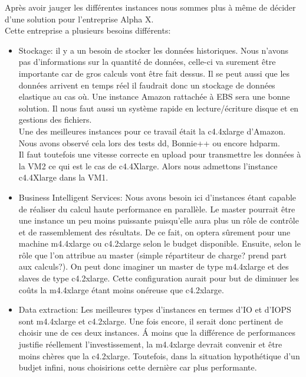 \documentclass[11pt]{article}
\begin{document}
Après avoir jauger les différentes instances nous sommes plus à même 
de décider d'une solution pour l'entreprise Alpha X. \\
Cette entreprise a plusieurs besoins différents:
\begin{itemize}
	\item Stockage: il y a un besoin de stocker les données historiques.
		Nous n'avons pas d'informations sur la quantité de données, 
		celle-ci va surement être importante car de gros calculs
		vont être fait dessus. Il se peut aussi que les données 
		arrivent en temps réel il faudrait donc un stockage de données
		elastique au cas où. Une instance Amazon rattachée à EBS
		sera une bonne solution. Il nous faut aussi un système
		rapide en lecture/écriture disque et en gestions des
		fichiers. \\
		Une des meilleures instances pour ce travail était la
		c4.4xlarge d'Amazon. Nous avons observé cela lors des
		tests dd, Bonnie++ ou encore hdparm.\\
		Il faut toutefois une vitesse correcte en upload pour
		transmettre les données à la VM2 ce qui est le cas
		de c4.4Xlarge. Alors nous admettons l'instance c4.4Xlarge dans la VM1.
	\item Business Intelligent Services: Nous avons besoin ici
		d'instances étant capable de réaliser du calcul
		haute performance en parallèle. Le master pourrait
		être une instance un peu moins puissante puisqu'elle
		aura plus un rôle de contrôle et de rassemblement
		des résultats. De ce fait, on optera sûrement pour une machine m4.4xlarge ou c4.2xlarge selon le budget disponible. Ensuite, selon le rôle que l'on attribue au master (simple répartiteur de charge? prend part aux calculs?). On peut donc imaginer un master de type
		m4.4xlarge et des slaves de type c4.2xlarge. Cette configuration aurait pour but de diminuer les coûts la m4.4xlarge étant moins onéreuse que c4.2xlarge.
	\item Data extraction: Les meilleures types d'instances en termes d'IO et d'IOPS sont m4.4xlarge et c4.2xlarge.
	Une fois encore, il serait donc pertinent de choisir une de ces deux instances. \'A moins que la différence de performances justifie réellement l'investissement, la m4.4xlarge devrait convenir et être moins chères que la c4.2xlarge. Toutefois, dans la situation hypothétique d'un budjet infini, nous choisirions cette dernière car plus performante.
\end{itemize}
\end{document}
